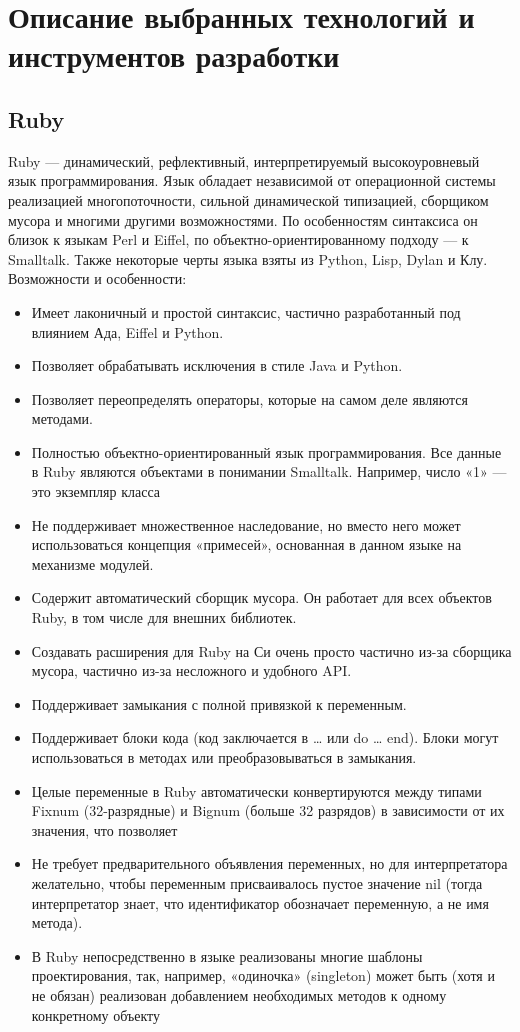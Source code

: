 \chapter{Описание выбранных технологий и инструментов разработки}\label{ch:ch3}

\section{Ruby}\label{sec:ch3/sect1}
Ruby — динамический, рефлективный, интерпретируемый высокоуровневый язык программирования. Язык обладает независимой от операционной системы реализацией многопоточности, сильной динамической типизацией, сборщиком мусора и многими другими возможностями. По особенностям синтаксиса он близок к языкам Perl и Eiffel, по объектно-ориентированному подходу — к Smalltalk. Также некоторые черты языка взяты из Python, Lisp, Dylan и Клу.
Возможности и особенности:

\begin{itemize}
  \item Имеет лаконичный и простой синтаксис, частично разработанный под влиянием Ада, Eiffel и Python.
  \item Позволяет обрабатывать исключения в стиле Java и Python.
  \item Позволяет переопределять операторы, которые на самом деле являются методами.
  \item Полностью объектно-ориентированный язык программирования. Все данные в Ruby являются объектами в понимании Smalltalk. Например, число «1» — это экземпляр класса 
  \item Не поддерживает множественное наследование, но вместо него может использоваться концепция «примесей», основанная в данном языке на механизме модулей.
  \item Содержит автоматический сборщик мусора. Он работает для всех объектов Ruby, в том числе для внешних библиотек.
  \item Создавать расширения для Ruby на Си очень просто частично из-за сборщика мусора, частично из-за несложного и удобного API.
  \item Поддерживает замыкания с полной привязкой к переменным.
  \item Поддерживает блоки кода (код заключается в { … } или do … end). Блоки могут использоваться в методах или преобразовываться в замыкания.
  \item Целые переменные в Ruby автоматически конвертируются между типами Fixnum (32-разрядные) и Bignum (больше 32 разрядов) в зависимости от их значения, что позволяет 
  \item Не требует предварительного объявления переменных, но для интерпретатора желательно, чтобы переменным присваивалось пустое значение nil (тогда интерпретатор знает, что идентификатор обозначает переменную, а не имя метода).
  \item В Ruby непосредственно в языке реализованы многие шаблоны проектирования, так, например, «одиночка» (singleton) может быть (хотя и не обязан) реализован добавлением необходимых методов к одному конкретному объекту 
\end{itemize}


